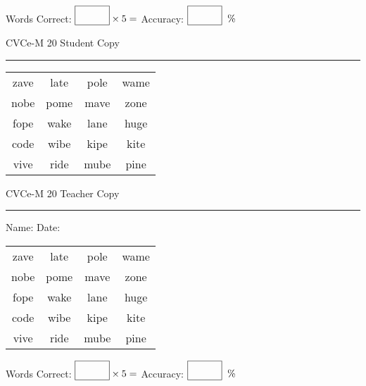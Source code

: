 \documentclass{memoir}
\begin{document}
\small

Words Correct: $\fbox{\phantom{\huge 100}} \times 5 = $ Accuracy: $\fbox{\phantom{\huge 100}}\;\; \%$ 

\vfill

\newpage



\footnotesize \noindent
CVCe-M 20 \hfill Student Copy
\smallskip
\hrule

\Large

\setlength{\tabcolsep}{14pt}
\def\arraystretch{2}

{\selectfont


\begin{vplace}[0.5]
\begin{center}
\begin{tabular}{cccc}
zave & late & pole & wame \\
nobe & pome & mave & zone \\
fope & wake & lane & huge \\
code & wibe & kipe & kite \\
vive & ride & mube & pine \\
\end{tabular}
\end{center}
\end{vplace}

}

\newpage

\footnotesize \noindent
CVCe-M 20 \hfill Teacher Copy
\smallskip
\hrule

\small

\vfill

\noindent
Name: \underline{\hspace{1.75in}} \hfill Date: \underline{\hspace{1in}}

\Large

{\selectfont


\begin{vplace}[0.5]
\begin{center}
\begin{tabular}{cccc}
zave & late & pole & wame \\
nobe & pome & mave & zone \\
fope & wake & lane & huge \\
code & wibe & kipe & kite \\
vive & ride & mube & pine \\
\end{tabular}
\end{center}
\end{vplace}



}

\small

Words Correct: $\fbox{\phantom{\huge 100}} \times 5 = $ Accuracy: $\fbox{\phantom{\huge 100}}\;\; \%$ 

\vfill

\end{document}
